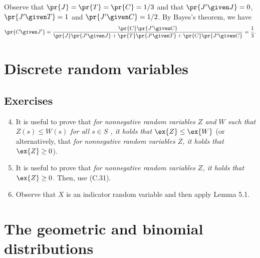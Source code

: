 \begin{enumerate}[\thesection-1]
Observe that $\pr{J} = \pr{T} = \pr{C} = 1/3$ and that $\pr{J' \given J} = 0$, $\pr{J' \given T} = 1$ and $\pr{J' \given C} = 1/2$. By Bayes's theorem, we have
\[
\pr{C \given J'} = \frac{\pr{C} \pr{J' \given C}}{\pr{J} \pr{J' \given J} + \pr{T} \pr{J' \given T} + \pr{C} \pr{J' \given C}} = \frac{1}{3}.
\]
%
\end{enumerate}

\section{Discrete random variables}
\subsection*{Exercises}
\begin{enumerate}[\thesection-1]
%
\setcounter{enumi}{3}
%
\item It is useful to prove that \emph{for nonnegative random variables $Z$ and $W$ such that $Z(s) \leq W(s)$ for all $s \in S$ , it holds that $\ex{Z} \leq \ex{W}$} (or alternatively, that \emph{for nonnegative random variables $Z$, it holds that $\ex{Z} \geq 0$}).
%
\setcounter{enumi}{7}
%
\item It is useful to prove that \emph{for nonnegative random variables $Z$, it holds that $\ex{Z} \geq 0$}. Then, use (C.31).
%
\item Observe that $X$ is an indicator random variable and then apply Lemma 5.1.
%
\end{enumerate}

\section{The geometric and binomial distributions}
